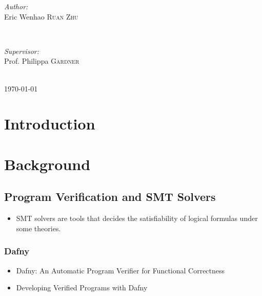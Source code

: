 \documentclass[12pt]{article}
\begin{document}
\begin{titlepage}
\begin{minipage}{0.4\textwidth}
\begin{flushleft} \large
\emph{Author:}\\
Eric Wenhao \textsc{Ruan Zhu}
\end{flushleft}
\end{minipage}
~
\begin{minipage}{0.5\textwidth}
\begin{flushright} \large
\emph{Supervisor:} \\
Prof. Philippa \textsc{Gardner} \\[0.5cm]
\end{flushright}
\end{minipage}\\[1cm]


{\large \today}\\[0.5cm]

\vfill

\end{titlepage}


\section{Introduction}


\section{Background}

\subsection{Program Verification and SMT Solvers}
\begin{itemize}
    \item SMT solvers are tools that decides the satisfiability of logical formulas under some theories.
\end{itemize}

\subsubsection{Dafny}
\begin{itemize}
    \item Dafny: An Automatic Program Verifier for Functional Correctness
    \item Developing Verified Programs with Dafny
\end{itemize}
\end{document}
